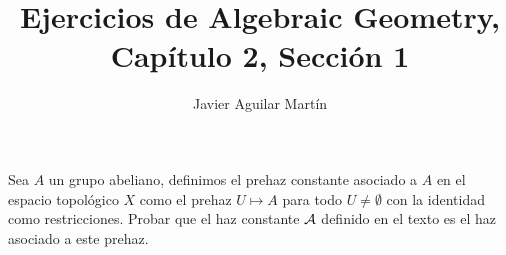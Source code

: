 \documentclass[twoside]{article}
\begin{document}
\title{Ejercicios de Algebraic Geometry, Capítulo 2, Sección 1}
\author{Javier Aguilar Martín}
\maketitle


\begin{ejercicio}{1.1}
Sea $A$ un grupo abeliano, definimos el prehaz constante asociado a $A$ en el espacio topológico $X$ como el prehaz $U\mapsto A$ para todo $U\neq\emptyset$ con la identidad como restricciones. Probar que el haz constante $\mathcal{A}$ definido en el texto es el haz asociado a este prehaz. 
\end{ejercicio}
\begin{solucion}

\end{solucion}

\newpage


\begin{ejercicio}{1.2}

\end{ejercicio}
\begin{solucion}

\end{solucion}

\newpage

\begin{ejercicio}{1.3}


\end{ejercicio}
\begin{solucion}



\end{solucion}

\newpage

\begin{ejercicio}{1.6}

\end{ejercicio}
\begin{solucion}

\end{solucion}

\newpage

\begin{ejercicio}{1.7}

\end{ejercicio}
\begin{solucion}

\end{solucion}

\newpage
\end{document}

